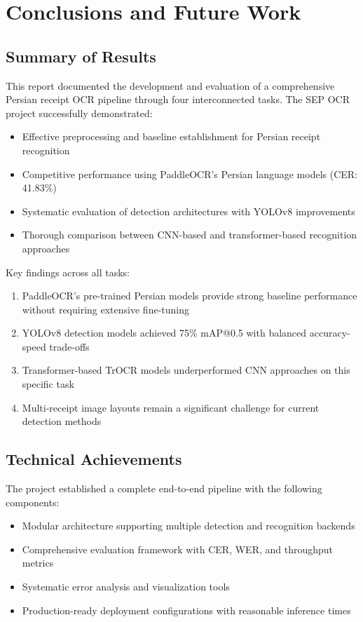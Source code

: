 \documentclass[11pt,a4paper]{article}
\begin{document}
\section{Conclusions and Future Work}

\subsection{Summary of Results}
This report documented the development and evaluation of a comprehensive Persian receipt OCR pipeline through four interconnected tasks. The SEP OCR project successfully demonstrated:

\begin{itemize}
  \item Effective preprocessing and baseline establishment for Persian receipt recognition
  \item Competitive performance using PaddleOCR's Persian language models (CER: 41.83\%)
  \item Systematic evaluation of detection architectures with YOLOv8 improvements
  \item Thorough comparison between CNN-based and transformer-based recognition approaches
\end{itemize}

Key findings across all tasks:
\begin{enumerate}
  \item PaddleOCR's pre-trained Persian models provide strong baseline performance without requiring extensive fine-tuning
  \item YOLOv8 detection models achieved 75\% mAP@0.5 with balanced accuracy-speed trade-offs
  \item Transformer-based TrOCR models underperformed CNN approaches on this specific task
  \item Multi-receipt image layouts remain a significant challenge for current detection methods
\end{enumerate}

\subsection{Technical Achievements}
The project established a complete end-to-end pipeline with the following components:
\begin{itemize}
  \item Modular architecture supporting multiple detection and recognition backends
  \item Comprehensive evaluation framework with CER, WER, and throughput metrics
  \item Systematic error analysis and visualization tools
  \item Production-ready deployment configurations with reasonable inference times
\end{itemize}
\end{document}
